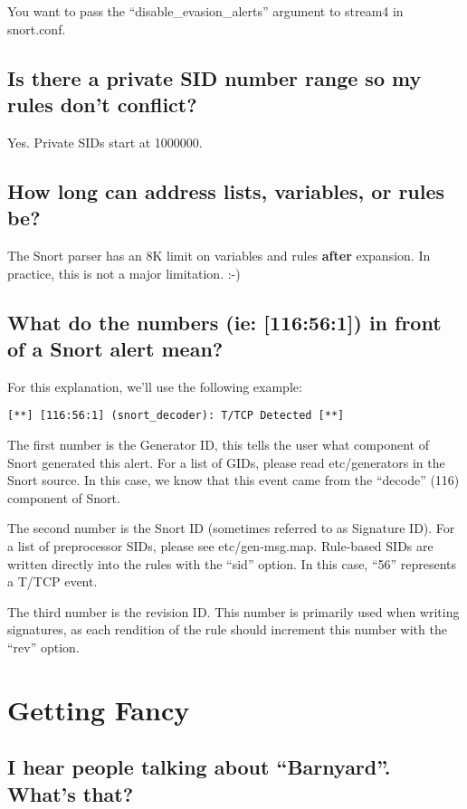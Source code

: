 \documentclass{article}
\begin{document}
You want to pass the ``disable\_evasion\_alerts'' argument to stream4 in
snort.conf.

\subsection{Is there a private SID number range so my rules don't conflict?}

Yes. Private SIDs start at 1000000.

\subsection{How long can address lists, variables, or rules be?}

The Snort parser has an 8K limit on variables and rules {\bf after} expansion. In
practice, this is not a major limitation. :-)

\subsection{What do the numbers (ie: [116:56:1]) in front of a Snort alert mean?}

For this explanation, we'll use the following example:
\begin{verbatim}
[**] [116:56:1] (snort_decoder): T/TCP Detected [**]
\end{verbatim}
The first number is the Generator ID, this tells the user what component
of Snort generated this alert. For a list of GIDs, please read
etc/generators in the Snort source. In this case, we know that this event
came from the ``decode'' (116) component of Snort.

The second number is the Snort ID (sometimes referred to as Signature
ID). For a list of preprocessor SIDs, please see etc/gen-msg.map.
Rule-based SIDs are written directly into the rules with the ``sid''
option. In this case, ``56'' represents a T/TCP event.

The third number is the revision ID. This number is primarily used when
writing signatures, as each rendition of the rule should increment this
number with the ``rev'' option.


\section{Getting Fancy}

\subsection{I hear people talking about ``Barnyard''. What's that?\label{barnyard}}
\end{document}
